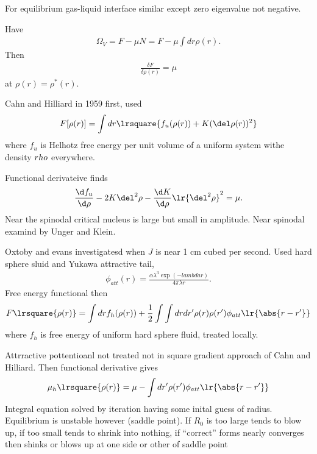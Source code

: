 {For equilibrium gas-liquid interface similar except zero eigenvalue not negative. 

Have
\begin{align}
\Omega_V = F - \mu N = F - \mu \int dr \rho(r).
\end{align}
Then \begin{align}
\frac{\delta F}{\delta \rho(r)} = \mu
\end{align}
at $\rho(r) = \rho^\ast(r)$.

Cahn and Hilliard in 1959 first,
used
\begin{align}
F[\rho(r)] = \int dr \lrsquare{f_u (\rho(r)) + K(\del \rho(r))^2}
\end{align}
where $f_u$ is Helhotz free energy per unit volume of a uniform system withe density $\\rho$ everywhere.

Functional derivateive finds
\begin{align}
\frac{\d f_u}{\d \rho} - 2K \del^2 \rho - \frac{\d K}{\d \rho}\lr{\del^2 \rho}^2 = \mu.
\end{align}
Near the spinodal critical nucleus is large but small in amplitude.
Near spinodal examind by Unger and Klein. 

Oxtoby and evans investigatesd when $J$ is near 1 cm cubed per second. 
Used hard sphere sluid and Yukawa attractive tail,
\begin{align}
\phi_{att}(r) = \frac{\alpha \lambda^3 \exp(-lambda r)}{4\pi \lambda r}.
\end{align}
Free energy functional then
\begin{align}
F\lrsquare{\rho(r)} = \int d r f_h(\rho(r)) + \frac{1}{2}\int \int dr dr^\prime \rho(r) \rho(r^\prime) \phi_{att}\lr{\abs{r-r^\prime}}
\end{align}
where $f_h$ is free energy of uniform hard sphere fluid, treated locally.

Attrractive pottentioanl not treated not in square gradient approach of Cahn and Hilliard.
Then functional derivative gives
\begin{align}
\mu_h\lrsquare{\rho(r)} = \mu - \int d r^\prime \rho(r^\prime) \phi_{att} \lr{\abs{r-r^\prime}}
\end{align}
Integral equation solved by iteration having some inital guess of radius.
Equilibrium is unstable however (saddle point).
If $R_0$ is too large tends to blow up, if too small tends to shrink into nothing,
if ``correct'' forms nearly converges then shinks or blows up at one side or other of saddle point

}
